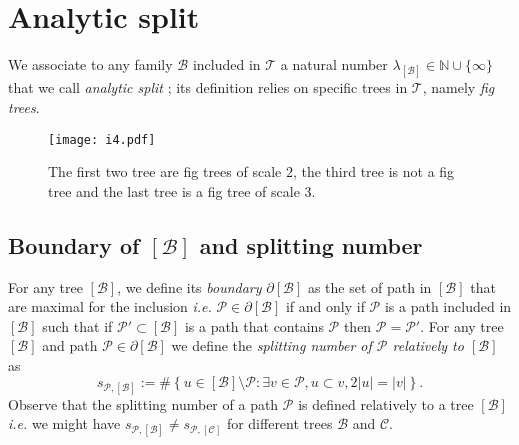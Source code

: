 \documentclass{article}
\begin{document}
\section{Analytic split}\label{ S : ana split }





We associate to any family $\mathcal{B}$ included in $\mathcal{T}$ a natural number $\lambda_{[\mathcal{B}]} \in \mathbb{N} \cup \{ \infty \}$ that we call \textit{analytic split} ; its definition relies on specific trees in $\mathcal{T}$, namely \textit{fig trees}.




\begin{figure}[h!]
\centering
\texttt{[image: i4.pdf]}
\caption{The first two tree are fig trees of scale $2$, the third tree is not a fig tree and the last tree is a fig tree of scale $3$.}  
\end{figure}


\subsection*{Boundary of $\left[\mathcal{B}\right]$ and splitting number}

For any tree $[\mathcal{B}]$, we define its \textit{boundary} $\partial [\mathcal{B}]$ as the set of path in $[\mathcal{B}]$ that are maximal for the inclusion \textit{i.e.} $\mathcal{P} \in \partial [\mathcal{B}]$ if and only if $\mathcal{P}$ is a path included in $[\mathcal{B}]$ such that if $\mathcal{P}' \subset [\mathcal{B}]$ is a path that contains $\mathcal{P}$ then $\mathcal{P} = \mathcal{P}'$. For any tree $[\mathcal{B}]$ and path $\mathcal{P} \in \partial[\mathcal{B}]$ we define the \textit{splitting number of $\mathcal{P}$ relatively to $[\mathcal{B}]$} as $$s_{\mathcal{P},[\mathcal{B}]} := \# \left\{ u \in [\mathcal{B}] \setminus \mathcal{P} : \exists v \in \mathcal{P}, u \subset v, 2|u| = |v| \right\}.$$ Observe that the splitting number of a path $\mathcal{P}$ is defined relatively to a tree $[\mathcal{B}]$ \textit{i.e.} we might have $s_{\mathcal{P},[\mathcal{B}]} \neq s_{\mathcal{P},[\mathcal{C}]}$ for different trees $\mathcal{B}$ and $\mathcal{C}$.
\end{document}
